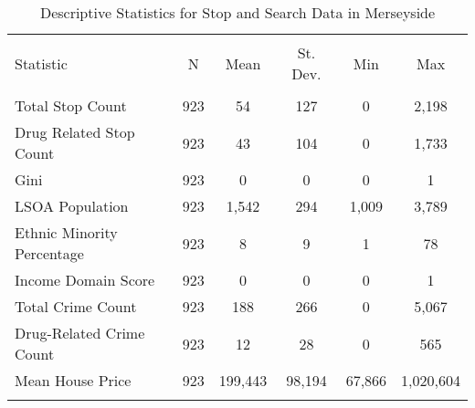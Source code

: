 
\begin{table}[!htbp] \centering 
  \caption{Descriptive Statistics for Stop and Search Data in Merseyside} 
  \label{tab:descriptive_merseyside} 
\begin{tabular}{@{\extracolsep{5pt}}lccccc} 
\\[-1.8ex]\hline 
\hline \\[-1.8ex] 
Statistic & \multicolumn{1}{c}{N} & \multicolumn{1}{c}{Mean} & \multicolumn{1}{c}{St. Dev.} & \multicolumn{1}{c}{Min} & \multicolumn{1}{c}{Max} \\ 
\hline \\[-1.8ex] 
Total Stop Count & 923 & 54 & 127 & 0 & 2,198 \\ 
Drug Related Stop Count & 923 & 43 & 104 & 0 & 1,733 \\ 
Gini & 923 & 0 & 0 & 0 & 1 \\ 
LSOA Population & 923 & 1,542 & 294 & 1,009 & 3,789 \\ 
Ethnic Minority Percentage & 923 & 8 & 9 & 1 & 78 \\ 
Income Domain Score & 923 & 0 & 0 & 0 & 1 \\ 
Total Crime Count & 923 & 188 & 266 & 0 & 5,067 \\ 
Drug-Related Crime Count & 923 & 12 & 28 & 0 & 565 \\ 
Mean House Price & 923 & 199,443 & 98,194 & 67,866 & 1,020,604 \\ 
\hline \\[-1.8ex] 
\end{tabular} 
\end{table} 

